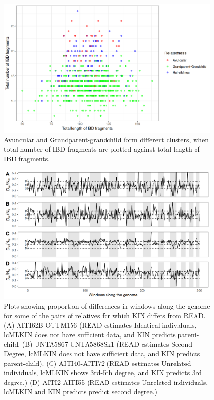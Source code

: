 \documentclass[12pt, letterpaper]{article}
\begin{document}
\begin{figure}[h!]
    \centering
    \includegraphics[width=18cm]{supplementary_info/plots/degree2_10Mwin.png}
    \caption{Avuncular and Grandparent-grandchild form different clusters, when total number of IBD fragments are plotted against total length of IBD fragments.}
    \label{figS7:second_degree}
\end{figure}


\begin{figure}[!ht]
    \centering
    \includegraphics[width=18cm]{supplementary_info/plots/egplot1.png}
    \caption{Plots showing proportion of differences in windows along the genome for some of the pairs of relatives for which KIN differs from READ. (A) AITI62B-OTTM156 (READ estimates Identical individuals, lcMLKIN does not have sufficient data, and KIN predicts parent-child. (B) UNTA5867-UNTA5868Sk1 (READ estimates Second Degree, lcMLKIN does not have sufficient data, and KIN predicts parent-child). (C) AITI40-AITI72 (READ estimates Unrelated individuals, lcMLKIN shows 3rd-5th degree, and KIN predicts 3rd degree.)
    (D) AITI2-AITI55 (READ estimates Unrelated individuals, lcMLKIN and KIN predicts predict second degree.)}
    \label{figS8:eg1}
\end{figure}
\end{document}
